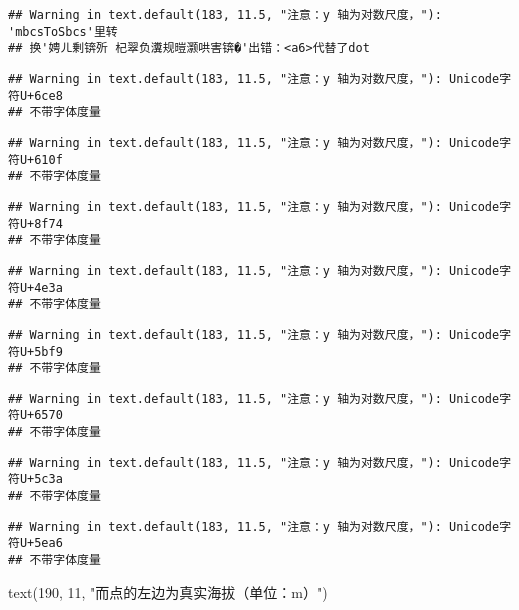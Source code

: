 \documentclass[
]{article}
\newenvironment{Shaded}{\begin{snugshade}}{\end{snugshade}}
\newcommand{\DecValTok}[1]{\textcolor[rgb]{0.00,0.00,0.81}{#1}}
\newcommand{\FunctionTok}[1]{\textcolor[rgb]{0.00,0.00,0.00}{#1}}
\newcommand{\NormalTok}[1]{#1}
\newcommand{\StringTok}[1]{\textcolor[rgb]{0.31,0.60,0.02}{#1}}
\begin{document}
\begin{verbatim}
## Warning in text.default(183, 11.5, "注意：y 轴为对数尺度，"): 'mbcsToSbcs'里转
## 换'娉ㄦ剰锛歽 杞翠负瀵规暟灏哄害锛�'出错：<a6>代替了dot
\end{verbatim}

\begin{verbatim}
## Warning in text.default(183, 11.5, "注意：y 轴为对数尺度，"): Unicode字符U+6ce8
## 不带字体度量
\end{verbatim}

\begin{verbatim}
## Warning in text.default(183, 11.5, "注意：y 轴为对数尺度，"): Unicode字符U+610f
## 不带字体度量
\end{verbatim}

\begin{verbatim}
## Warning in text.default(183, 11.5, "注意：y 轴为对数尺度，"): Unicode字符U+8f74
## 不带字体度量
\end{verbatim}

\begin{verbatim}
## Warning in text.default(183, 11.5, "注意：y 轴为对数尺度，"): Unicode字符U+4e3a
## 不带字体度量
\end{verbatim}

\begin{verbatim}
## Warning in text.default(183, 11.5, "注意：y 轴为对数尺度，"): Unicode字符U+5bf9
## 不带字体度量
\end{verbatim}

\begin{verbatim}
## Warning in text.default(183, 11.5, "注意：y 轴为对数尺度，"): Unicode字符U+6570
## 不带字体度量
\end{verbatim}

\begin{verbatim}
## Warning in text.default(183, 11.5, "注意：y 轴为对数尺度，"): Unicode字符U+5c3a
## 不带字体度量
\end{verbatim}

\begin{verbatim}
## Warning in text.default(183, 11.5, "注意：y 轴为对数尺度，"): Unicode字符U+5ea6
## 不带字体度量
\end{verbatim}

\begin{Shaded}
\begin{Highlighting}[]
\FunctionTok{text}\NormalTok{(}\DecValTok{190}\NormalTok{, }\DecValTok{11}\NormalTok{, }\StringTok{"而点的左边为真实海拔（单位：m）"}\NormalTok{)}
\end{Highlighting}
\end{Shaded}
\end{document}
